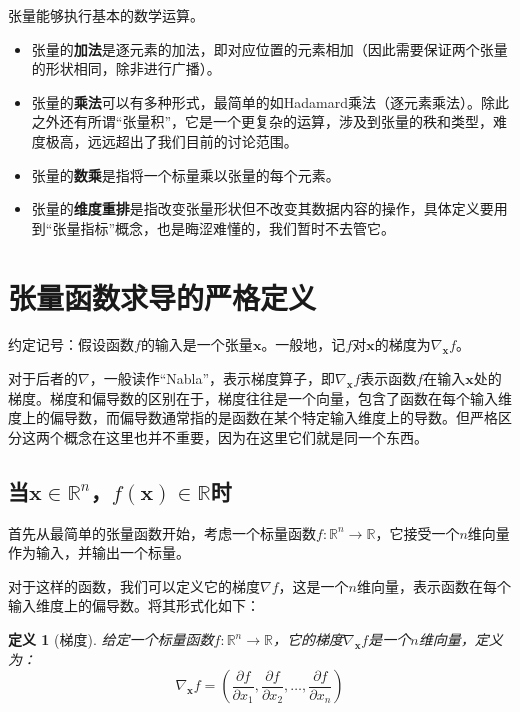 \documentclass[
    UTF8,
    a4paper,
    12pt
]{ctexart}
\newtheorem{definition}{定义}
\begin{document}
张量能够执行基本的数学运算。
\begin{itemize}
    \item 张量的\textbf{加法}是逐元素的加法，即对应位置的元素相加（因此需要保证两个张量的形状相同，除非进行广播）。
    \item 张量的\textbf{乘法}可以有多种形式，最简单的如Hadamard乘法（逐元素乘法）。除此之外还有所谓“张量积”，它是一个更复杂的运算，涉及到张量的秩和类型，难度极高，远远超出了我们目前的讨论范围。
    \item 张量的\textbf{数乘}是指将一个标量乘以张量的每个元素。
    \item 张量的\textbf{维度重排}是指改变张量形状但不改变其数据内容的操作，具体定义要用到“张量指标”概念，也是晦涩难懂的，我们暂时不去管它。 
\end{itemize}

\section{张量函数求导的严格定义}

约定记号：假设函数$f$的输入是一个张量$\mathbf{x}$。一般地，记$f$对$\mathbf{x}$的梯度为$\nabla_\mathbf{x} f$。

对于后者的$\nabla$，一般读作“Nabla”，表示梯度算子，即$\nabla_\mathbf{x} f$表示函数$f$在输入$\mathbf{x}$处的梯度。梯度和偏导数的区别在于，梯度往往是一个向量，包含了函数在每个输入维度上的偏导数，而偏导数通常指的是函数在某个特定输入维度上的导数。但严格区分这两个概念在这里也并不重要，因为在这里它们就是同一个东西。

\subsection{当$\mathbf{x}\in\mathbb{R}^n$，$f(\mathbf{x})\in \mathbb{R}$时}

首先从最简单的张量函数开始，考虑一个标量函数$f: \mathbb{R}^n \to \mathbb{R}$，它接受一个$n$维向量作为输入，并输出一个标量。

对于这样的函数，我们可以定义它的梯度$\nabla f$，这是一个$n$维向量，表示函数在每个输入维度上的偏导数。将其形式化如下：
\begin{definition}[梯度]
    给定一个标量函数$f: \mathbb{R}^n \to \mathbb{R}$，它的梯度$\nabla_\mathbf{x} f$是一个$n$维向量，定义为：
    \begin{equation}
        \nabla_\mathbf{x} f = \left( \frac{\partial f}{\partial x_1}, \frac{\partial f}{\partial x_2}, \ldots, \frac{\partial f}{\partial x_n} \right)
    \end{equation}
\end{definition}
\end{document}
